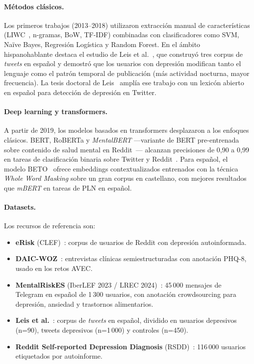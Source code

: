 \documentclass[12pt,a4paper,spanish]{article}
\begin{document}
\paragraph{Métodos clásicos.} Los primeros trabajos (2013--2018) utilizaron extracción manual de características (LIWC~\cite{leis2019tesis}, n-gramas, BoW, TF-IDF) combinadas con clasificadores como SVM, Naïve Bayes, Regresión Logística y Random Forest. En el ámbito hispanohablante destaca el estudio de Leis et al.~\cite{jmir2019spanish}, que construyó tres corpus de \emph{tweets} en español y demostró que los usuarios con depresión modifican tanto el lenguaje como el patrón temporal de publicación (más actividad nocturna, mayor frecuencia). La tesis doctoral de Leis~\cite{leis2019tesis} amplía ese trabajo con un lexicón abierto en español para detección de depresión en Twitter.

\paragraph{Deep learning y transformers.} A partir de 2019, los modelos basados en transformers desplazaron a los enfoques clásicos. BERT, RoBERTa y \emph{MentalBERT} —variante de BERT pre-entrenada sobre contenido de salud mental en Reddit~\cite{aisel2023mentalbert}— alcanzan precisiones de 0{,}90 a 0{,}99 en tareas de clasificación binaria sobre Twitter y Reddit~\cite{saeedi2024transformer,jmhs2024,pmc12417627}. Para español, el modelo BETO~\cite{betohf} ofrece embeddings contextualizados entrenados con la técnica \emph{Whole Word Masking} sobre un gran corpus en castellano, con mejores resultados que \emph{mBERT} en tareas de PLN en español.

\paragraph{Datasets.} Los recursos de referencia son:
\begin{itemize}[leftmargin=2em]
    \item \textbf{eRisk} (CLEF)~\cite{losada2017erisk}: corpus de usuarios de Reddit con depresión autoinformada.
    \item \textbf{DAIC-WOZ}~\cite{daicwoz2014}: entrevistas clínicas semiestructuradas con anotación PHQ-8, usado en los retos AVEC.
    \item \textbf{MentalRiskES} (IberLEF 2023 / LREC 2024)~\cite{aclanthology2024mentalriskes}: 45\,000 mensajes de Telegram en español de 1\,300 usuarios, con anotación crowdsourcing para depresión, ansiedad y trastornos alimentarios.
    \item \textbf{Leis et al.}~\cite{jmir2019spanish}: corpus de \emph{tweets} en español, dividido en usuarios depresivos (n=90), tweets depresivos (n=1\,000) y controles (n=450).
    \item \textbf{Reddit Self-reported Depression Diagnosis} (RSDD)~\cite{bucuram2025datasets}: 116\,000 usuarios etiquetados por autoinforme.
\end{itemize}
\end{document}
